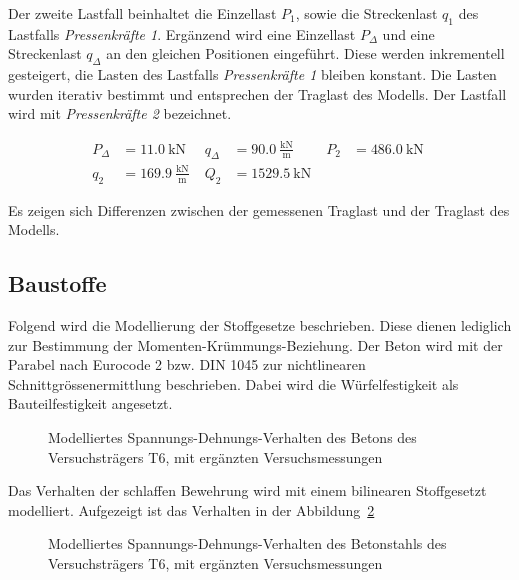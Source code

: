 \documentclass[
  11pt,
  letterpaper,
]{scrreprt}
\begin{document}
Der zweite Lastfall beinhaltet die Einzellast \(P_{1}\), sowie die
Streckenlast \(q_1\) des Lastfalls \emph{Pressenkräfte 1}. Ergänzend
wird eine Einzellast \(P_{\Delta}\) und eine Streckenlast \(q_{\Delta}\)
an den gleichen Positionen eingeführt. Diese werden inkrementell
gesteigert, die Lasten des Lastfalls \emph{Pressenkräfte 1} bleiben
konstant. Die Lasten wurden iterativ bestimmt und entsprechen der
Traglast des Modells. Der Lastfall wird mit \emph{Pressenkräfte 2}
bezeichnet.

$$
\begin{aligned}
P_{\Delta} &= 11.0\ \mathrm{kN} \; 
 &q_{\Delta} &= 90.0\ \frac{\mathrm{kN}}{\mathrm{m}} \; 
 &P_{2} &= 486.0\ \mathrm{kN} \; 
\\[10pt]
 q_{2} &= 169.9\ \frac{\mathrm{kN}}{\mathrm{m}} \; 
 &Q_{2} &= 1529.5\ \mathrm{kN} \;
\end{aligned}
$$

Es zeigen sich Differenzen zwischen der gemessenen Traglast und der
Traglast des Modells.

\subsection{Baustoffe}\label{baustoffe}

Folgend wird die Modellierung der Stoffgesetze beschrieben. Diese dienen
lediglich zur Bestimmung der Momenten-Krümmungs-Beziehung. Der Beton
wird mit der Parabel nach Eurocode 2 bzw. DIN 1045 zur nichtlinearen
Schnittgrössenermittlung beschrieben. Dabei wird die Würfelfestigkeit
als Bauteilfestigkeit angesetzt.

\begin{figure}[H]


\caption{\label{fig-sigma_epc_t6}Modelliertes
Spannungs-Dehnungs-Verhalten des Betons des Versuchsträgers T6, mit
ergänzten Versuchsmessungen}

\end{figure}%

Das Verhalten der schlaffen Bewehrung wird mit einem bilinearen
Stoffgesetzt modelliert. Aufgezeigt ist das Verhalten in der
Abbildung~\ref{fig-sigma_eps_t6}

\begin{figure}[H]


\caption{\label{fig-sigma_eps_t6}Modelliertes
Spannungs-Dehnungs-Verhalten des Betonstahls des Versuchsträgers T6, mit
ergänzten Versuchsmessungen}

\end{figure}%
\end{document}
